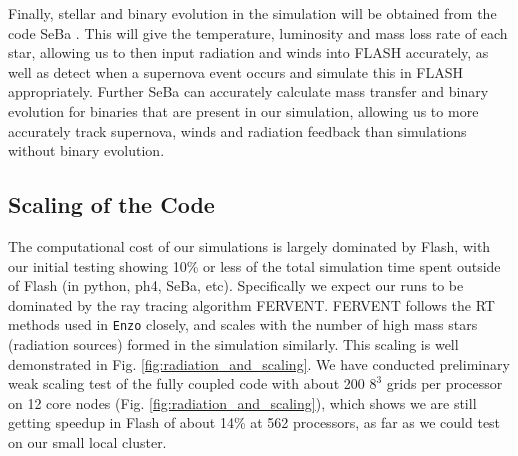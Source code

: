 \documentclass[11pt]{article}
\begin{document}
Finally, stellar and binary evolution in the simulation will be obtained from the code SeBa \citep{Portegies_SeBa}. This will give the temperature, luminosity and mass loss rate of each star, allowing us to then input radiation and winds into FLASH accurately, as well as detect when a supernova event occurs and simulate this in FLASH appropriately. Further SeBa can accurately calculate mass transfer and binary evolution for binaries that are present in our simulation, allowing us to more accurately track supernova, winds and radiation feedback than simulations without binary evolution.

\subsection{Scaling of the Code}

The computational cost of our simulations is largely dominated by Flash, with our initial testing showing 10\% or less of the total simulation time spent outside of Flash (in python, ph4, SeBa, etc). Specifically we expect our runs to be dominated by the ray tracing algorithm FERVENT. FERVENT follows the RT methods used in \texttt{Enzo} closely, and scales with the number of high mass stars (radiation sources) formed in the simulation similarly. This scaling is well demonstrated in Fig. \ref{fig:radiation_and_scaling}. We have conducted preliminary weak scaling test of the fully coupled code with about 200 $8^3$ grids per processor on 12 core nodes (Fig. \ref{fig:radiation_and_scaling}), which shows we are still getting speedup in Flash of about 14\% at 562 processors, as far as we could test on our small local cluster. %



\clearpage

\begingroup
    \setlength{\bibsep}{10pt}
    
\endgroup
\end{document}
